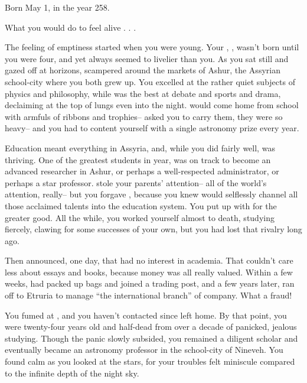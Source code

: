 \documentclass[char]{Kos}
\begin{document}
\name{\cAnarchist{}}
 
Born May 1, in the year 258.

What you would do to feel alive . . .

The feeling of emptiness started when you were young. Your \cMerchant{\sibling}, \cMerchant{\nickname}, wasn’t born until you were four, and yet \cMerchant{\they} always seemed to livelier than you. As you sat still and gazed off at horizons, \cMerchant{\they} scampered around the markets of Ashur, the Assyrian school-city where you both grew up. You excelled at the rather quiet subjects of physics and philosophy, while \cMerchant{\they} was the best at debate and sports and drama, declaiming at the top of \cMerchant{\their} lungs even into the night. \cMerchant{\They} would come home from school with armfuls of ribbons and trophies-- \cMerchant{\they} asked you to carry them, they were so heavy-- and you had to content yourself with a single astronomy prize every year.

Education meant everything in Assyria, and, while you did fairly well, \cMerchant{\nickname} was thriving. One of the greatest students in \cMerchant{\their} year, \cMerchant{\they} was on track to become an advanced researcher in Ashur, or perhaps a well-respected administrator, or perhaps a star professor. \cMerchant{\They} stole your parents’ attention-- all of the world’s attention, really-- but you forgave \cMerchant{\them}, because you knew \cMerchant{\they} would selflessly channel all those acclaimed talents into the education system. You put up with \cMerchant{\them} for the greater good. All the while, you worked yourself almost to death, studying fiercely, clawing for some successes of your own, but you had lost that rivalry long ago.

Then \cMerchant{\they} announced, one day, that \cMerchant{\they} had no interest in academia. That \cMerchant{\they} couldn’t care less about essays and books, because money was all \cMerchant{\they} really valued. Within a few weeks, \cMerchant{\they} had packed up \cMerchant{\their} bags and joined a trading post, and a few years later, \cMerchant{\they} ran off to Etruria to manage “the international branch” of \cMerchant{\their} company. What a fraud!

You fumed at \cMerchant{\them}, and you haven’t contacted \cMerchant{\them} since \cMerchant{\they} left home. By that point, you were twenty-four years old and half-dead from over a decade of panicked, jealous studying. Though the panic slowly subsided, you remained a diligent scholar and eventually became an astronomy professor in the school-city of Nineveh. You found calm as you looked at the stars, for your troubles felt miniscule compared to the infinite depth of the night sky.
\end{document}
